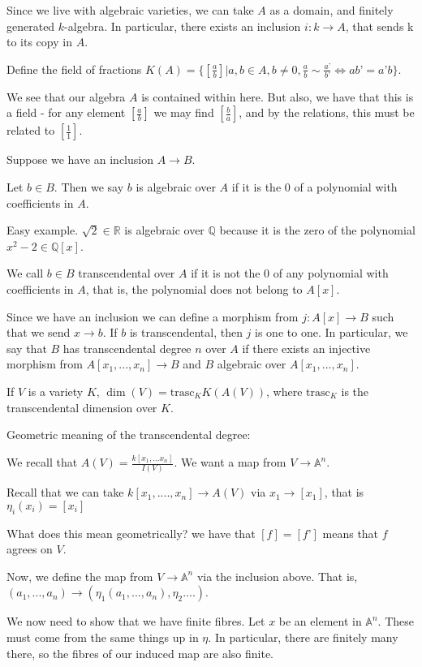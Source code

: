 \documentclass[10pt]{article}
\begin{document}
Since we live with algebraic varieties, we can take $A$ as a domain, and finitely generated $k$-algebra. In particular, there exists an inclusion $i: k \rightarrow A$, that sends k to its copy in $A$.

Define the field of fractions $K(A) = \{ [\frac{a}{b} ] | a,b \in A, b \not = 0, \frac{a}{b} \sim \frac{a’}{b’} \iff ab’ = a’b \}$.

We see that our algebra $A$ is contained within here. But also, we have that this is a field - for any element $[\frac{a}{b} ]$ we may find $[\frac{b}{a} ]$, and by the relations, this must be related to $[\frac{1}{1}]$.

Suppose we have an inclusion $A \rightarrow B$.

Let $b \in B$. Then we say $b$ is algebraic over $A$ if it is the $0$ of a polynomial with coefficients in $A$.

Easy example. $\sqrt{2} \in \mathbb{R}$ is algebraic over $\mathbb{Q}$ because it is the zero of the polynomial $x^2 - 2 \in \mathbb{Q}[x]$.

We call $b \in B$ transcendental over $A$ if it is not the $0$ of any polynomial with coefficients in $A$, that is, the polynomial does not belong to $A[x]$.

Since we have an inclusion we can define a morphism from $j: A[x] \to B$ such that we send $x \to b$. If $b$ is transcendental, then $j$ is one to one. In particular, we say that $B$ has transcendental degree $n$ over $A$ if there exists an injective morphism from $A[x_1,...,x_n] \to B$ and $B$ algebraic over $A[x_1,...,x_n]$.

If $V$ is a variety $K$, $\dim(V) = \text{trasc}_K K(A(V))$, where $\text{trasc}_K$ is the transcendental dimension over $K$.

Geometric meaning of the transcendental degree:

We recall that $A(V) = \frac{k[x_1,...x_n]}{I(V)}$. We want a map from $V \to \mathbb{A}^n$.

Recall that we can take $k[x_1,....,x_n]  \to A(V)$ via $x_1 \to [x_1]$, that is $\eta_i(x_i) = [x_i]$

What does this mean geometrically? we have that $[f] = [f’]$ means that $f$ agrees on $V$.

Now, we define the map from $V \to \mathbb{A}^n$ via the inclusion above. That is, $(a_1,...,a_n) \to (\eta_1(a_1,...,a_n), \eta_2....)$.

We now need to show that we have finite fibres. Let $x$ be an element in $\mathbb{A}^n$. These must come from the same things up in $\eta$. In particular, there are finitely many there, so the fibres of our induced map are also finite.
\end{document}
